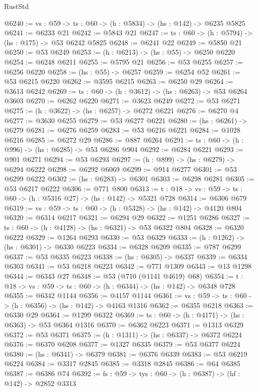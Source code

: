 \begin{lexlean}{RustStd}
\begin{coremodule}
@6240 := {vs : @59} -> {ts : @60} -> (h : @5834) -> (hs : @142) -> @6235 @5825
@6241 := @6233 @21
@6242 := @5843 @21
@6247 := {ts : @60} -> (h : @5794) -> (hs : @175) -> @53 @6242 @5825
@6248 := @6241 @22
@6249 := @5850 @21
@6250 := @53 @6249
@6253 := (h : @6213) -> (hs : @55) -> @6250 @6220
@6254 := @6248 @6211
@6255 := @5795 @21
@6256 := @53 @6255
@6257 := @6256 @6220
@6258 := (hs : @55) -> @6257
@6259 := @6254 @52
@6261 := @53 @6215 @6220
@6262 := @3595 @6215
@6263 := @6250 @29
@6264 := @3613 @6242
@6269 := {ts : @60} -> (h : @3612) -> (hs : @6263) -> @53 @6264 @3603
@6270 := @6262 @6220
@6271 := @3623 @6249
@6272 := @53 @6271
@6275 := (h : @3622) -> (hs : @6257) -> @6272 @6221
@6276 := @6270 @4
@6277 := @3630 @6255
@6279 := @53 @6277 @6221
@6280 := (hs : @6261) -> @6279
@6281 := @6276 @6259
@6283 := @53 @6216 @6221
@6284 := @1028 @6216
@6285 := @6272 @29
@6286 := @887 @6264
@6291 := {ts : @60} -> (h : @996) -> (hs : @6285) -> @53 @6286 @904
@6292 := @6284 @6221
@6293 := @901 @6271
@6294 := @53 @6293
@6297 := (h : @899) -> (hs : @6279) -> @6294 @6222
@6298 := @6292 @6069
@6299 := @914 @6277
@6301 := @53 @6299 @6222
@6302 := (hs : @6283) -> @6301
@6303 := @6298 @6281
@6305 := @53 @6217 @6222
@6306 := @771 @800
@6313 := {t : @18} -> {vs : @59} -> {ts : @60} -> (h : @5316 @27) -> (hs : @142) -> @5321 @728
@6314 := @6306 @679
@6319 := {vs : @59} -> {ts : @60} -> (h : @5328) -> (hs : @142) -> @4120 @804
@6320 := @6314 @6217
@6321 := @6294 @29
@6322 := @1251 @6286
@6327 := {ts : @60} -> (h : @4128) -> (hs : @6321) -> @53 @6322 @804
@6328 := @6320 @6222
@6329 := @1264 @6293
@6330 := @53 @6329
@6333 := (h : @1262) -> (hs : @6301) -> @6330 @6223
@6334 := @6328 @6209
@6335 := @787 @6299
@6337 := @53 @6335 @6223
@6338 := (hs : @6305) -> @6337
@6339 := @6334 @6303
@6341 := @53 @6218 @6223
@6342 := @771 @1309
@6343 := @13 @1298
@6344 := @6343 @27
@6348 := @53 (@710 (@1141 @4619) @68)
@6354 := {t : @18} -> {vs : @59} -> {ts : @60} -> (h : @6344) -> (hs : @142) -> @6348 @728
@6355 := @6342 @1144
@6356 := @4157 @1144
@6361 := {vs : @59} -> {ts : @60} -> (h : @6356) -> (hs : @142) -> @4163 @1316
@6362 := @6355 @6218
@6363 := @6330 @29
@6364 := @1299 @6322
@6369 := {ts : @60} -> (h : @4171) -> (hs : @6363) -> @53 @6364 @1316
@6370 := @6362 @6223
@6371 := @1313 @6329
@6372 := @53 @6371
@6375 := (h : @1311) -> (hs : @6337) -> @6372 @6224
@6376 := @6370 @6208
@6377 := @1327 @6335
@6379 := @53 @6377 @6224
@6380 := (hs : @6341) -> @6379
@6381 := @6376 @6339
@6383 := @53 @6219 @6224
@6384 := @3317 @2845
@6385 := @3318 @2845
@6386 := @64 @6385
@6387 := @6386 @74
@6392 := {fs : @59} -> {tys : @60} -> (h : @6387) -> (hf : @142) -> @2852 @3313

\end{coremodule}
\end{lexlean}
